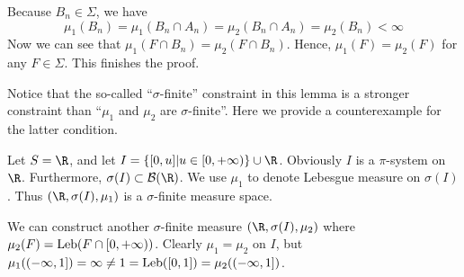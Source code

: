 Because $B_n \in \Sigma$, we have 
\[\mu_1(B_n) = \mu_1(B_n \cap A_n) = \mu_2(B_n \cap A_n) = \mu_2(B_n) < \infty\]
Now we can see that $\mu_1(F \cap B_n) = \mu_2(F \cap B_n)$. Hence, $\mu_1(F) = \mu_2(F)$ for any $F \in \Sigma$. This finishes the proof.

Notice that the so-called ``$\sigma$-finite'' constraint in this lemma is a stronger constraint than ``$\mu_1$ and $\mu_2$ are $\sigma$-finite''. Here we provide a counterexample for the latter condition.

\begin{example}

Let $S = \R$, and let $I = \{[0, u] | u \in [0, +\infty)\} \cup \R$. Obviously $I$ is a $\pi$-system on $\R$. Furthermore, $\sigma(I) \subset \mathcal{B}(\R)$. We use $\mu_1$ to denote Lebesgue measure on $\sigma(I)$. Thus
 $(\R, \sigma(I), \mu_1)$ is a $\sigma$-finite measure space.

We can construct another $\sigma$-finite measure $(\R, \sigma(I), \mu_2)$ where $\mu_2(F) = \operatorname{Leb}(F \cap [0, +\infty))$. Clearly $\mu_1 = \mu_2$ on $I$, but $\mu_1((-\infty, 1]) = \infty \neq 1 = \operatorname{Leb}([0, 1]) = \mu_2((-\infty, 1])$.
 
\end{example}


